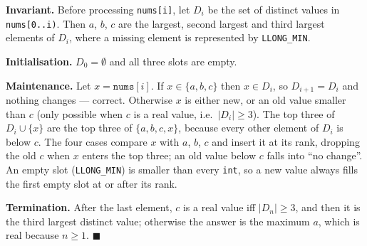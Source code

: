 \begin{invariantbox}
\textbf{Invariant.} Before processing \texttt{nums[i]}, let $D_i$ be the set of distinct values in \texttt{nums[0..i)}. Then $a$, $b$, $c$ are the largest, second largest and third largest elements of $D_i$, where a missing element is represented by \texttt{LLONG\_MIN}.

\textbf{Initialisation.} $D_0 = \emptyset$ and all three slots are empty.

\textbf{Maintenance.} Let $x = \texttt{nums}[i]$. If $x \in \{a, b, c\}$ then $x \in D_i$, so $D_{i+1} = D_i$ and nothing changes --- correct. Otherwise $x$ is either new, or an old value smaller than $c$ (only possible when $c$ is a real value, i.e.\ $|D_i| \ge 3$). The top three of $D_i \cup \{x\}$ are the top three of $\{a, b, c, x\}$, because every other element of $D_i$ is below $c$. The four cases compare $x$ with $a$, $b$, $c$ and insert it at its rank, dropping the old $c$ when $x$ enters the top three; an old value below $c$ falls into ``no change''. An empty slot (\texttt{LLONG\_MIN}) is smaller than every \texttt{int}, so a new value always fills the first empty slot at or after its rank.

\textbf{Termination.} After the last element, $c$ is a real value iff $|D_n| \ge 3$, and then it is the third largest distinct value; otherwise the answer is the maximum $a$, which is real because $n \ge 1$. \hfill$\blacksquare$
\end{invariantbox}

